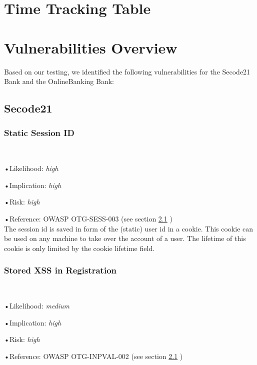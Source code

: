 \documentclass[headsepline,footsepline,footinclude=false,oneside,fontsize=11pt,paper=a4,listof=totoc,bibliography=totoc]{scrbook} %
\begin{document}


\frontmatter{}

%
%
%
%
\tableofcontents{}

\mainmatter{}

\chapter{Time Tracking Table}
%
\chapter{Vulnerabilities Overview}
Based on our testing, we identified the following vulnerabilities for the Secode21
Bank and the OnlineBanking Bank:
\section{Secode21}
\subsection{Static Session ID}\label{Static Session ID}\

•Likelihood: \textit{high}\

•Implication: \textit{high}\

•Risk: \textit{high}\

•Reference: OWASP OTG-SESS-003 (see section \ref{} )\\

The session id is saved in form of the (static) user id in a cookie. This cookie can be used on any machine
to take over the account of a user. The lifetime of this cookie is only limited by the cookie lifetime field.


\subsection{Stored XSS in Registration}\label{Stored XSS in Registration}\

•Likelihood: \textit{medium}\

•Implication: \textit{high}\

•Risk: \textit{high}\

•Reference: OWASP OTG-INPVAL-002 (see section \ref{} )\\
\end{document}
